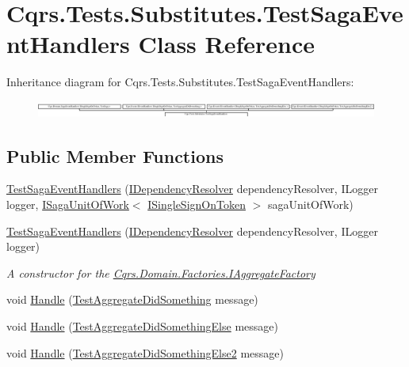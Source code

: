 \hypertarget{classCqrs_1_1Tests_1_1Substitutes_1_1TestSagaEventHandlers}{}\section{Cqrs.\+Tests.\+Substitutes.\+Test\+Saga\+Event\+Handlers Class Reference}
\label{classCqrs_1_1Tests_1_1Substitutes_1_1TestSagaEventHandlers}
Inheritance diagram for Cqrs.\+Tests.\+Substitutes.\+Test\+Saga\+Event\+Handlers\+:\begin{figure}[H]
\begin{center}
\leavevmode
\includegraphics[height=0.550098cm]{classCqrs_1_1Tests_1_1Substitutes_1_1TestSagaEventHandlers}
\end{center}
\end{figure}
\subsection*{Public Member Functions}
\begin{DoxyCompactItemize}
\item 
\hyperlink{classCqrs_1_1Tests_1_1Substitutes_1_1TestSagaEventHandlers_a3e06754c734bf0d7a3c18a97ce68497a}{Test\+Saga\+Event\+Handlers} (\hyperlink{interfaceCqrs_1_1Configuration_1_1IDependencyResolver}{I\+Dependency\+Resolver} dependency\+Resolver, I\+Logger logger, \hyperlink{interfaceCqrs_1_1Domain_1_1ISagaUnitOfWork}{I\+Saga\+Unit\+Of\+Work}$<$ \hyperlink{interfaceCqrs_1_1Authentication_1_1ISingleSignOnToken}{I\+Single\+Sign\+On\+Token} $>$ saga\+Unit\+Of\+Work)
\item 
\hyperlink{classCqrs_1_1Tests_1_1Substitutes_1_1TestSagaEventHandlers_a3bf5ebcf037900b52a1d33e7b848f770}{Test\+Saga\+Event\+Handlers} (\hyperlink{interfaceCqrs_1_1Configuration_1_1IDependencyResolver}{I\+Dependency\+Resolver} dependency\+Resolver, I\+Logger logger)
\begin{DoxyCompactList}\small\item\em A constructor for the \hyperlink{interfaceCqrs_1_1Domain_1_1Factories_1_1IAggregateFactory}{Cqrs.\+Domain.\+Factories.\+I\+Aggregate\+Factory} \end{DoxyCompactList}\item 
void \hyperlink{classCqrs_1_1Tests_1_1Substitutes_1_1TestSagaEventHandlers_a6160e0aacb592f32da125c2e22e64fe4}{Handle} (\hyperlink{classCqrs_1_1Tests_1_1Substitutes_1_1TestAggregateDidSomething}{Test\+Aggregate\+Did\+Something} message)
\item 
void \hyperlink{classCqrs_1_1Tests_1_1Substitutes_1_1TestSagaEventHandlers_acc569a13706ab279219cc0986ed9b9d2}{Handle} (\hyperlink{classCqrs_1_1Tests_1_1Substitutes_1_1TestAggregateDidSomethingElse}{Test\+Aggregate\+Did\+Something\+Else} message)
\item 
void \hyperlink{classCqrs_1_1Tests_1_1Substitutes_1_1TestSagaEventHandlers_aec2d678e12381f49a05185f359db5bd6}{Handle} (\hyperlink{classCqrs_1_1Tests_1_1Substitutes_1_1TestAggregateDidSomethingElse2}{Test\+Aggregate\+Did\+Something\+Else2} message)
\end{DoxyCompactItemize}
